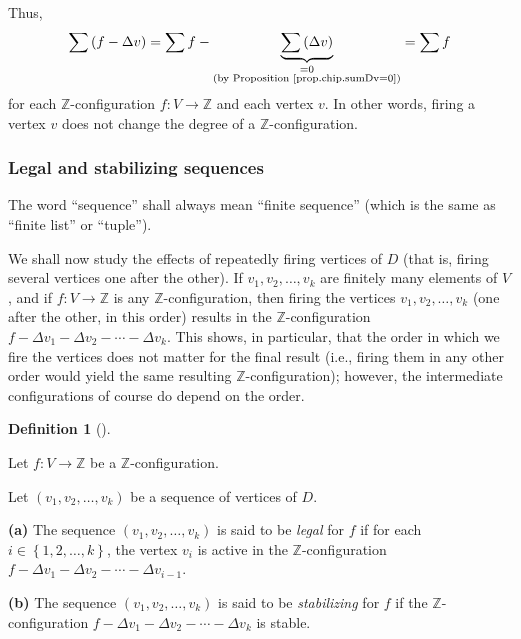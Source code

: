 \documentclass[numbers=enddot,12pt,final,onecolumn,notitlepage]{scrartcl}%
\theoremstyle{definition}
\newtheorem{defi}[theo]{Definition}
\newenvironment{definition}[1][]
{\begin{defi}[#1]\begin{leftbar}}
{\end{leftbar}\end{defi}}
\let\sumnonlimits\sum
\renewcommand{\sum}{\sumnonlimits\limits}
\newcommand{\ZZ}{\mathbb{Z}}
\newcommand{\set}[1]{\left\{ #1 \right\}}
\newcommand{\tup}[1]{\left( #1 \right)}
\newcommand{\underbrack}[2]{\underbrace{#1}_{\substack{#2}}}
\begin{document}
Thus,
\[
\sum \tup{f - \Delta v}
= \sum f - \underbrack{\sum \tup{\Delta v}}{= 0 \\ \text{(by Proposition~\ref{prop.chip.sumDv=0})}}
= \sum f
\]
for each $\ZZ$-configuration $f : V \to \ZZ$ and each vertex $v$.
In other words, firing a vertex $v$ does not change the degree of
a $\ZZ$-configuration.

\subsubsection{Legal and stabilizing sequences}

The word ``sequence'' shall always mean ``finite sequence''
(which is the same as ``finite list'' or ``tuple'').

We shall now study the effects of repeatedly firing vertices
of $D$ (that is, firing several vertices one after the other).
If $v_1, v_2, \ldots, v_k$ are finitely many elements of $V$,
and if $f : V \to \ZZ$ is any $\ZZ$-configuration,
then firing the vertices $v_1, v_2, \ldots, v_k$
(one after the other, in this order) results in the
$\ZZ$-configuration
$f - \Delta v_1 - \Delta v_2 - \cdots - \Delta v_k$.
This shows, in particular, that the order in which we fire
the vertices does not matter for the final result
(i.e., firing them in any other order would yield the same
resulting $\ZZ$-configuration);
however, the intermediate configurations of course do depend
on the order.

\begin{definition}
Let $f : V \to \ZZ$ be a $\ZZ$-configuration.

Let $\tup{v_1, v_2, \ldots, v_k}$ be a sequence of vertices of
$D$.

\textbf{(a)} The sequence $\tup{v_1, v_2, \ldots, v_k}$ is said
to be \textit{legal} for $f$ if for each
$i \in \set{1, 2, \ldots, k}$, the vertex $v_i$ is active in
the $\ZZ$-configuration
$f - \Delta v_1 - \Delta v_2 - \cdots - \Delta v_{i-1}$.

\textbf{(b)} The sequence $\tup{v_1, v_2, \ldots, v_k}$ is said
to be \textit{stabilizing} for $f$ if the $\ZZ$-configuration
$f - \Delta v_1 - \Delta v_2 - \cdots - \Delta v_k$ is stable.
\end{definition}
\end{document}
